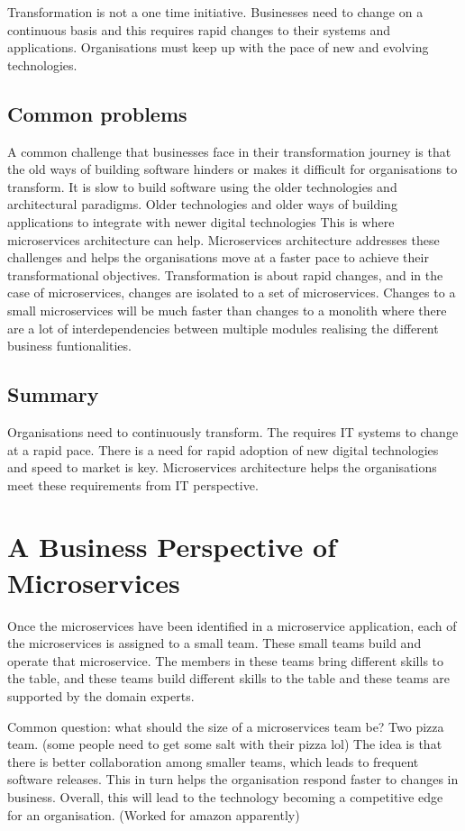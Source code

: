 Transformation is not a one time initiative.
Businesses need to change on a continuous basis and this requires rapid changes to their systems and applications.
Organisations must keep up with the pace of new and evolving technologies.

\subsection{Common problems}
A common challenge that businesses face in their transformation journey is that the old ways of building software hinders or makes it difficult for organisations to transform.
It is slow to build software using the older technologies and architectural paradigms.
Older technologies and older ways of building applications to integrate with newer digital technologies
This is where microservices architecture can help.
Microservices architecture addresses these challenges and helps the organisations move at a faster pace to achieve their transformational objectives.
Transformation is about rapid changes, and in the case of microservices, changes are isolated to a set of microservices.
Changes to a small microservices will be much faster than changes to a monolith where there are a lot of interdependencies between multiple modules realising the different business funtionalities.

\subsection{Summary}
Organisations need to continuously transform.
The requires IT systems to change at a rapid pace.
There is a need for rapid adoption of new digital technologies and speed to market is key.
Microservices architecture helps the organisations meet these requirements from IT perspective.

\section{A Business Perspective of Microservices}

Once the microservices have been identified in a microservice application, each of the microservices is assigned to a small team.
These small teams build and operate that microservice.
The members in these teams bring different skills to the table, and these teams build different skills to the table and these teams are supported by the domain experts.

Common question: what should the size of a microservices team be? Two pizza team. (some people need to get some salt with their pizza lol)
The idea is that there is better collaboration among smaller teams, which leads to frequent software releases.
This in turn helps the organisation respond faster to changes in business.
Overall, this will lead to the technology becoming a competitive edge for an organisation. (Worked for amazon apparently)

